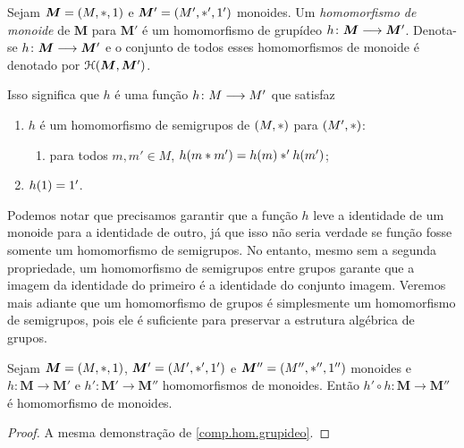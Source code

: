 \begin{definition}
Sejam $\bm M=(M,\ast,1)$ e $\bm M'=(M',\ast',1')$ monoides. Um \emph{homomorfismo de monoide} de $\bm M$ para $\bm M'$ é um homomorfismo de grupídeo ${h}\colon {\bm M} \longrightarrow {\bm M'}$. Denota-se ${h}\colon {\bm M} \longrightarrow {\bm M'}$ e o conjunto de todos esses homomorfismos de monoide é denotado por $\mathcal{H}(\bm M,\bm M')$.
\end{definition}

Isso significa que $h$ é uma função ${h}\colon {M} \longrightarrow {M'}$ que satisfaz
	\begin{enumerate}
	\item $h$ é um homomorfismo de semigrupos de $(M,\ast)$ para $(M',\ast)$:
		\begin{enumerate}
		\item para todos $m,m' \in M$, $h(m \ast m') = h(m) \ast' h(m')$;
		\end{enumerate}
	\item $h(1)=1'$.
	\end{enumerate}

Podemos notar que precisamos garantir que a função $h$ leve a identidade de um monoide para a identidade de outro, já que isso não seria verdade se função fosse somente um homomorfismo de semigrupos. No entanto, mesmo sem a segunda propriedade, um homomorfismo de semigrupos entre grupos garante que a imagem da identidade do primeiro é a identidade do conjunto imagem. Veremos mais adiante que um homomorfismo de grupos é simplesmente um homomorfismo de semigrupos, pois ele é suficiente para preservar a estrutura algébrica de grupos.

\begin{proposition}
\label{comp.hom.mon}
Sejam $\bm M=(M,\ast,1)$, $\bm M'=(M',\ast',1')$ e $\bm M''=(M'',\ast'',1'')$ monoides e $h: \bm M \to \bm M'$ e $h': \bm M' \to \bm M''$ homomorfismos de monoides. Então $h' \circ h: \bm M \to \bm M''$ é homomorfismo de monoides.
\end{proposition}
\begin{proof}
A mesma demonstração de \ref{comp.hom.grupideo}.
\end{proof}



